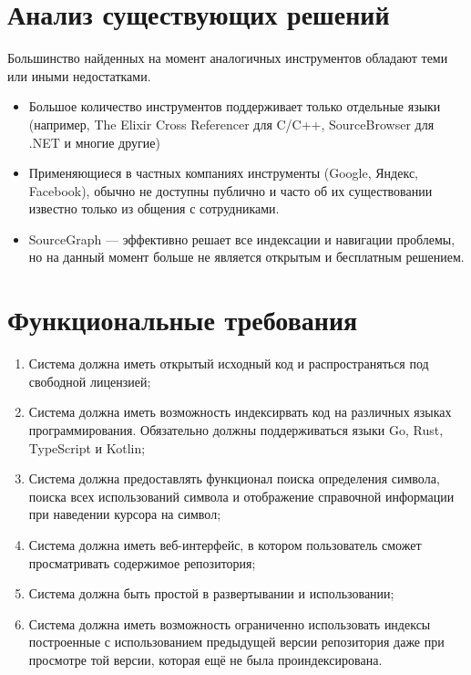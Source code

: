\documentclass[aspectratio=169,professionalfonts,10pt]{beamer}
\begin{document}
\section{Анализ существующих решений}
\begin{frame}{\insertsection}

Большинство найденных на момент аналогичных инструментов обладают теми или иными недостатками.

\begin{itemize}
    \item Большое количество инструментов поддерживает только отдельные языки (например, The Elixir Cross Referencer \cite{elixir-crossreferencer} для C/C++, SourceBrowser \cite{SourceBrowser} для .NET и многие другие)
    \item Применяющиеся в частных компаниях инструменты (Google, Яндекс, Facebook), обычно не доступны публично и часто об их существовании известно только из общения с сотрудниками.
    \item SourceGraph \cite{sourcegraph} — эффективно решает все индексации и навигации проблемы, но на данный момент больше не является открытым и бесплатным решением.
\end{itemize}

\end{frame}

\section{Функциональные требования}
\begin{frame}{\insertsection}

\begin{enumerate}
    \item Система должна иметь открытый исходный код и распространяться под свободной лицензией;
    \item Система должна иметь возможность индексирвать код на различных языках программирования. Обязательно должны поддерживаться языки Go, Rust, TypeScript и Kotlin;
    \item Система должна предоставлять функционал поиска определения символа, поиска всех использований символа и отображение справочной информации при наведении курсора на символ;
    \item Система должна иметь веб-интерфейс, в котором пользователь сможет просматривать содержимое репозитория;
    \item Система должна быть простой в развертывании и использовании;
    \item Система должна иметь возможность ограниченно использовать индексы построенные с использованием предыдущей версии репозитория даже при просмотре той версии, которая ещё не была проиндексирована.
\end{enumerate}

\end{frame}
\end{document}
